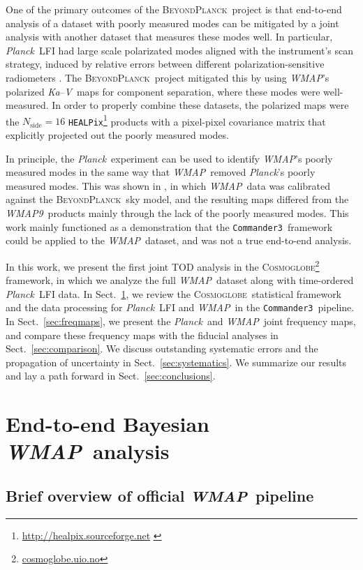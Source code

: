 \documentclass[twocolumn]{../../common/aa}
\def\WMAP{\emph{WMAP}}
\def\WMAPnine{\emph{WMAP9}}
\def\Planck{\emph{Planck}}
\def\healpix{\texttt{HEALPix}}
\def\commanderthree{\texttt{Commander3}}
\newcommand{\BP}{\textsc{BeyondPlanck}}
\newcommand{\bp}{\textsc{BeyondPlanck}}
\newcommand{\cosmoglobe}{\textsc{Cosmoglobe}}
\newcommand{\Ka}[0]{\textit{Ka}}
\newcommand{\V}[0]{\textit V}
\begin{document}
One of the primary outcomes of the \BP\ project is that end-to-end analysis of a dataset with poorly measured modes can be mitigated by a joint analysis with another dataset that measures these modes well. In particular, \Planck\ LFI had large scale polarizated modes aligned with the instrument's scan strategy, induced by relative errors between different polarization-sensitive radiometers \citep{bp07}. The \bp\ project mitigated this by using \WMAP's polarized \Ka--\V\ maps for component separation, where these modes were well-measured. In order to properly combine these datasets, the polarized maps were the $N_\mathrm{side}=16$ \healpix\footnote{\url{http://healpix.sourceforge.net} \citep{gorski2005}} products with a pixel-pixel covariance matrix that explicitly projected out the poorly measured modes.

In principle, the \Planck\ experiment can be used to identify \WMAP's poorly measured modes in the same way that \WMAP\ removed \Planck's poorly measured modes. This was shown in \citet{bp17}, in which \WMAP\ data was calibrated against the \bp\ sky model, and the resulting maps differed from the \WMAPnine\ products mainly through the lack of the poorly measured modes. This work mainly functioned as a demonstration that the \commanderthree\ framework could be applied to the \WMAP\ dataset, and was not a true end-to-end analysis.

In this work, we present the first joint TOD analysis in the \cosmoglobe\footnote{\url{cosmoglobe.uio.no}} framework, in which we analyze the full \WMAP\ dataset along with time-ordered \Planck\ LFI data. In Sect.~\ref{sec:methods}, we review the \cosmoglobe\ statistical framework and the data processing for \Planck\ LFI and \WMAP\ in the \commanderthree\ pipeline. In Sect.~\ref{sec:freqmaps}, we present the \Planck\ and \WMAP\ joint frequency maps, and compare these frequency maps with the fiducial analyses in Sect.~\ref{sec:comparison}. We discuss outstanding systematic errors and the propagation of uncertainty in Sect.~\ref{sec:systematics}. We summarize our results and lay a path forward in Sect.~\ref{sec:conclusions}.



\section{End-to-end Bayesian \WMAP\ analysis}
\label{sec:methods}

\subsection{Brief overview of official \WMAP\ pipeline}
\end{document}
